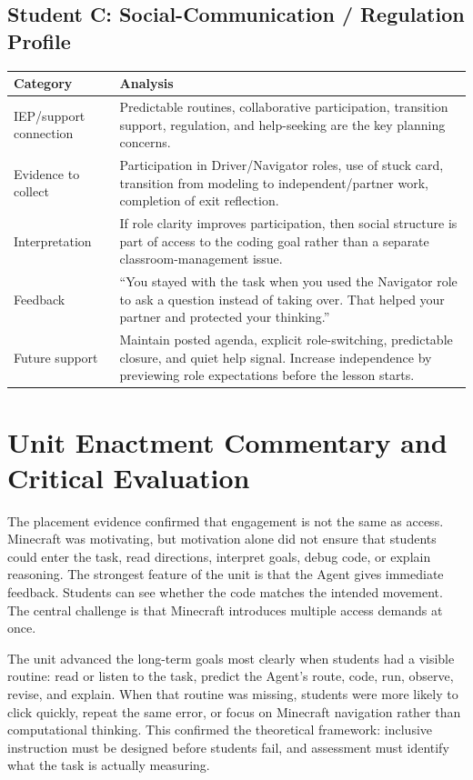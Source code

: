 \documentclass[12pt]{article}
\begin{document}
\subsection{Student C: Social-Communication / Regulation Profile}

\begin{xltabular}{\textwidth}{|P{1.4in}|L|}
\hline
{}\color{white}\bfseries Category & \color{white}\bfseries Analysis \\
\hline
IEP/support connection & Predictable routines, collaborative participation, transition support, regulation, and help-seeking are the key planning concerns. \\
\hline
{} Evidence to collect & Participation in Driver/Navigator roles, use of stuck card, transition from modeling to independent/partner work, completion of exit reflection. \\
\hline
Interpretation & If role clarity improves participation, then social structure is part of access to the coding goal rather than a separate classroom-management issue. \\
\hline
{} Feedback & ``You stayed with the task when you used the Navigator role to ask a question instead of taking over. That helped your partner and protected your thinking.'' \\
\hline
Future support & Maintain posted agenda, explicit role-switching, predictable closure, and quiet help signal. Increase independence by previewing role expectations before the lesson starts. \\
\hline
\end{xltabular}

\newpage
\section{Unit Enactment Commentary and Critical Evaluation}

The placement evidence confirmed that engagement is not the same as access. Minecraft was motivating, but motivation alone did not ensure that students could enter the task, read directions, interpret goals, debug code, or explain reasoning. The strongest feature of the unit is that the Agent gives immediate feedback. Students can see whether the code matches the intended movement. The central challenge is that Minecraft introduces multiple access demands at once.

The unit advanced the long-term goals most clearly when students had a visible routine: read or listen to the task, predict the Agent's route, code, run, observe, revise, and explain. When that routine was missing, students were more likely to click quickly, repeat the same error, or focus on Minecraft navigation rather than computational thinking. This confirmed the theoretical framework: inclusive instruction must be designed before students fail, and assessment must identify what the task is actually measuring.
\end{document}
